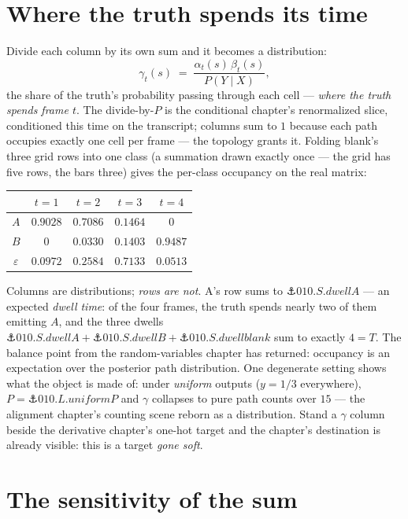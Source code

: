 \begin{narrative}
\section{Where the truth spends its time}

Divide each column by its own sum and it becomes a distribution:
\[
  \gamma_t(s) \;=\; \frac{\alpha_t(s)\,\beta_t(s)}{P(Y \mid X)} ,
\]
the share of the truth's probability passing through each cell —
\emph{where the truth spends frame $t$}. The divide-by-$P$ is the
conditional chapter's renormalized slice, conditioned this time on
the transcript; columns sum to $1$ because each path occupies
exactly one cell per frame — the topology grants it. Folding blank's
three grid rows into one class (a summation drawn exactly once — the
grid has five rows, the bars three) gives the per-class occupancy on
the real matrix:

\begin{center}
\begin{tabular}{c|cccc}
 & $t=1$ & $t=2$ & $t=3$ & $t=4$ \\
\hline
$A$ & $0.9028$ & $0.7086$ & $0.1464$ & $0$ \\
$B$ & $0$ & $0.0330$ & $0.1403$ & $0.9487$ \\
$\varepsilon$ & $0.0972$ & $0.2584$ & $0.7133$ & $0.0513$ \\
\end{tabular}
\end{center}

Columns are distributions; \emph{rows are not}. A's row sums to
$\anchor{010.S.dwellA}$ — an expected \emph{dwell time}: of the four
frames, the truth spends nearly two of them emitting $A$, and the
three dwells $\anchor{010.S.dwellA} + \anchor{010.S.dwellB} +
\anchor{010.S.dwellblank}$ sum to exactly $4 = T$. The balance point
from the random-variables chapter has returned: occupancy is an
expectation over the posterior path distribution. One degenerate
setting shows what the object is made of: under \emph{uniform}
outputs ($y = 1/3$ everywhere), $P = \anchor{010.L.uniformP}$ and
$\gamma$ collapses to pure path counts over $15$ — the alignment
chapter's counting scene reborn as a distribution. Stand a $\gamma$
column beside the derivative chapter's one-hot target and the
chapter's destination is already visible: this is a target
\emph{gone soft}.

\section{The sensitivity of the sum}


\end{narrative}
